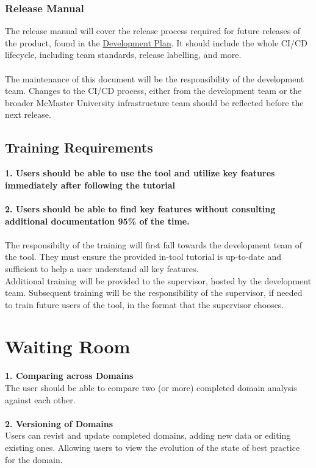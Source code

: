 \documentclass[12pt]{article}
\begin{document}
\subsubsection{Release Manual}
The release manual will cover the release process required for future releases of the product, found in the \href{https://github.com/thaafei/DomainX/blob/main/docs/DevelopmentPlan/DevelopmentPlan.pdf}{Development Plan}. It should include the whole CI/CD lifecycle, including team standards, release labelling, and more.\\
\\The maintenance of this document will be the responsibility of the development team. Changes to the CI/CD process, either from the development team or the broader McMaster University infrastructure team should be reflected before the next release.

\subsection{Training Requirements}
\textbf{1. Users should be able to use the tool and utilize key features immediately after following the tutorial} \\ \\
\textbf{2. Users should be able to find key features without consulting additional documentation 95\% of the time.} \\ \\
The responsibilty of the training will first fall towards the development team of the tool. They must ensure the provided in-tool tutorial is up-to-date and sufficient to help a user understand all key features.
\\ Additional training will be provided to the supervisor, hosted by the development team.
Subsequent training will be the responsibility of the supervisor, if needed to train future users of the tool, in the format that the supervisor chooses.
\section{Waiting Room}
\textbf{1. Comparing across Domains}\\
The user should be able to compare two (or more) completed domain analysis against each other. \\\\
\textbf{2. Versioning of Domains}\\
Users can revist and update completed domains, adding new data or editing existing ones. Allowing users to view the evolution of the state of best practice for the domain.
\end{document}
